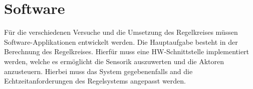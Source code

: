 \documentclass{article}
\begin{document}
\section{Software}
Für die verschiedenen Versuche und die Umsetzung des Regelkreises müssen Software-Applikationen entwickelt werden. Die Hauptaufgabe besteht in der Berechnung des Regelkreises. Hierfür muss eine HW-Schnittstelle implementiert werden, welche es ermöglicht die Sensorik auszuwerten und die Aktoren anzusteuern. Hierbei muss das System gegebenenfalls and die Echtzeitanforderungen des Regelsystems angepasst werden. 
\end{document}

